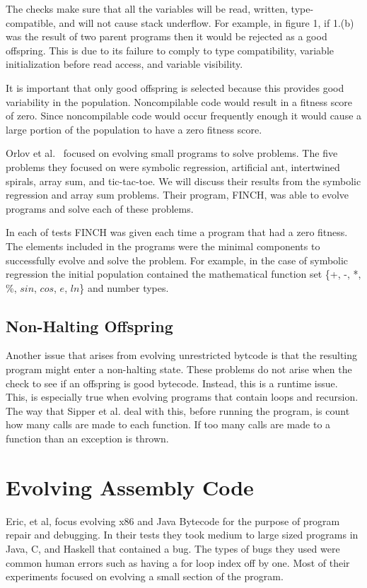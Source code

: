 \documentclass{sig-alternate}
\begin{document}
The checks make sure that all the variables will be read, written, type-compatible, and will not cause stack underflow\cite{VIII:2011}. For example, in figure 1, if 1.(b) was the result of two parent programs then it would be rejected as a good offspring. This is due to its failure to comply to type compatibility, variable initialization before read access, and variable visibility.\par
It is important that only good offspring is selected because this provides good variability in the population. Noncompilable code would result in a fitness score of zero. Since noncompilable code would occur frequently enough it would cause a large portion of the population to have a zero fitness score.


Orlov et al.~\cite{FINCH:2011} focused on evolving small programs to solve problems. The five problems they focused on were symbolic regression, artificial ant, intertwined spirals, array sum, and tic-tac-toe. We will discuss their results from the symbolic regression and array sum problems. Their program, FINCH, was able to evolve programs and solve each of these problems.

In each of tests FINCH was given each time a program that had a zero fitness. The elements included in the programs were the minimal components to successfully evolve and solve the problem. For example, in the case of symbolic regression the initial population contained the mathematical function set \{+, -, *, \%, $sin$, $cos$, $e$,  $ln$\} and number types.

\subsection{Non-Halting Offspring}
Another issue that arises from evolving unrestricted bytcode is that the resulting program might enter a non-halting state. These problems do not arise when the check to see if an offspring is good bytecode. Instead, this is a runtime issue. This, is especially true when evolving programs that contain loops and recursion.
The way that Sipper et al.\cite{FINCH:2011} deal with this, before running the program, is count how many calls are made to each function. If too many calls are made to a function than an exception is thrown.






\section{Evolving Assembly Code}
Eric, et al, focus evolving x86 and Java Bytecode for the purpose of program repair and debugging. In their tests they took medium to large sized programs in Java, C, and Haskell that contained a bug. The types of bugs they used were common human errors such as having a for loop index off by one. Most of their experiments focused on evolving a small section of the program.
\end{document}
